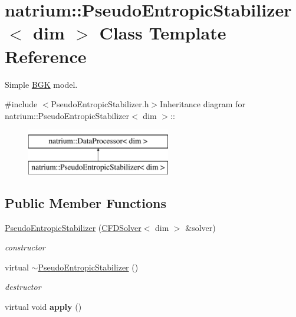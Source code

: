 \hypertarget{classnatrium_1_1PseudoEntropicStabilizer}{
\section{natrium::PseudoEntropicStabilizer$<$ dim $>$ Class Template Reference}
\label{classnatrium_1_1PseudoEntropicStabilizer}
}


Simple \hyperlink{classnatrium_1_1BGK}{BGK} model.  


{\ttfamily \#include $<$PseudoEntropicStabilizer.h$>$}Inheritance diagram for natrium::PseudoEntropicStabilizer$<$ dim $>$::\begin{figure}[H]
\begin{center}
\leavevmode
\includegraphics[height=2cm]{classnatrium_1_1PseudoEntropicStabilizer}
\end{center}
\end{figure}
\subsection*{Public Member Functions}
\begin{DoxyCompactItemize}
\item 
\hypertarget{classnatrium_1_1PseudoEntropicStabilizer_a50bd889195e9034b38157e6a90b3f84d}{
\hyperlink{classnatrium_1_1PseudoEntropicStabilizer_a50bd889195e9034b38157e6a90b3f84d}{PseudoEntropicStabilizer} (\hyperlink{classnatrium_1_1CFDSolver}{CFDSolver}$<$ dim $>$ \&solver)}
\label{classnatrium_1_1PseudoEntropicStabilizer_a50bd889195e9034b38157e6a90b3f84d}

\begin{DoxyCompactList}\small\item\em constructor \item\end{DoxyCompactList}\item 
\hypertarget{classnatrium_1_1PseudoEntropicStabilizer_af4ff07c0cf4ff17d4b4440aee4e537c1}{
virtual \hyperlink{classnatrium_1_1PseudoEntropicStabilizer_af4ff07c0cf4ff17d4b4440aee4e537c1}{$\sim$PseudoEntropicStabilizer} ()}
\label{classnatrium_1_1PseudoEntropicStabilizer_af4ff07c0cf4ff17d4b4440aee4e537c1}

\begin{DoxyCompactList}\small\item\em destructor \item\end{DoxyCompactList}\item 
\hypertarget{classnatrium_1_1PseudoEntropicStabilizer_a4eabfcc91f17789dfa4e3084ca3d6fb9}{
virtual void {\bfseries apply} ()}
\label{classnatrium_1_1PseudoEntropicStabilizer_a4eabfcc91f17789dfa4e3084ca3d6fb9}

\end{DoxyCompactItemize}


